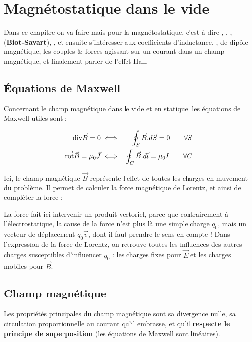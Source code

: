 \documentclass[12pt]{book}
\begin{document}
\chapter{Magnétostatique dans le vide}
Dans ce chapitre on va faire  mais pour la magnétostatique, c'est-à-dire , , ,  (\textbf{Biot-Savart}), , et ensuite s'intéresser aux coefficients d'inductance, , de dipôle magnétique, les couples \& forces agissant sur un courant dans un champ magnétique, et finalement parler de l'effet Hall. 

\section{Équations de Maxwell}
Concernant le champ magnétique dans le vide et en statique, les équations de Maxwell utiles sont :

\begin{eqnarray*}
\text{div}\vec{B} = 0 &\iff& \oint_S \vec{B}.d\vec{S} = 0 \qquad \forall S \\
\overrightarrow{\text{rot}} \vec{B} = \mu_0 \vec{J} &\iff& \oint _C\vec{B}.d\vec{l} = \mu_0 I \qquad \forall C
\end{eqnarray*}

Ici, le champ magnétique $\vec{B}$ représente l'effet de toutes les charges en muvement du problème. Il permet de calculer la force magnétique de Lorentz, et ainsi de compléter la force :

La force fait ici intervenir un produit vectoriel, parce que contrairement à l'électrostatique, la cause de la force n'est plus là une simple charge $q_0$, mais un vecteur de déplacement $q_0 \vec{v}$, dont il faut prendre le sens en compte ! Dans l'expression de la force de Lorentz, on retrouve toutes les influences des autres charges susceptibles d'influencer $q_0$ : les charges fixes pour $\vec{E}$ et les charges mobiles pour $\vec{B}$.
\section{Champ magnétique}
Les propriétés principales du champ magnétique sont sa divergence nulle, sa circulation proportionnelle au courant qu'il embrasse, et qu'il \textbf{respecte le principe de superposition} (les équations de Maxwell sont linéaires).
\end{document}
